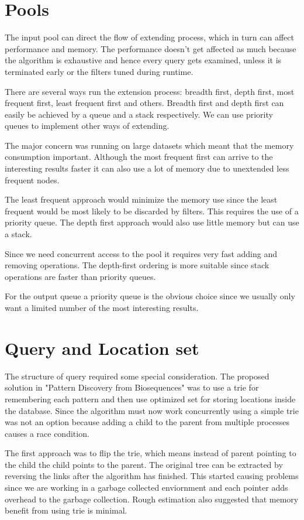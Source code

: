 \section{Pools}

The input pool can direct the flow of extending process, which in turn can affect performance and memory. The performance doesn't get affected as much because the algorithm is exhaustive and hence every query gets examined, unless it is terminated early or the filters tuned during runtime.

There are several ways run the extension process: breadth first, depth first, most frequent first, least frequent first and others. Breadth first and depth first can easily be achieved by a queue and a stack respectively. We can use priority queues to implement other ways of extending.

The major concern was running on large datasets which meant that the memory consumption important. Although the most frequent first can arrive to the interesting results faster it can also use a lot of memory due to unextended less frequent nodes.

The least frequent approach would minimize the memory use since the least frequent would be most likely to be discarded by filters. This requires the use of a priority queue. The depth first approach would also use little memory but can use a stack.

Since we need concurrent access to the pool it requires very fast adding and removing operations. The depth-first ordering is more suitable since stack operations are faster than priority queues.

For the output queue a priority queue is the obvious choice since we usually only want a limited number of the most interesting results.

\section{Query and Location set}

The structure of query required some special consideration. The proposed solution in "Pattern Discovery from Biosequences" was to use a trie for remembering each pattern and then use optimized set for storing locations inside the database. Since the algorithm must now work concurrently using a simple trie was not an option because adding a child to the parent from multiple processes causes a race condition. 

The first approach was to flip the trie, which means instead of parent pointing to the child the child points to the parent. The original tree can be extracted by reversing the links after the algorithm has finished. This started causing problems since we are working in a garbage collected enviornment and each pointer adds overhead to the garbage collection. Rough estimation also suggested that memory benefit from using trie is minimal.

